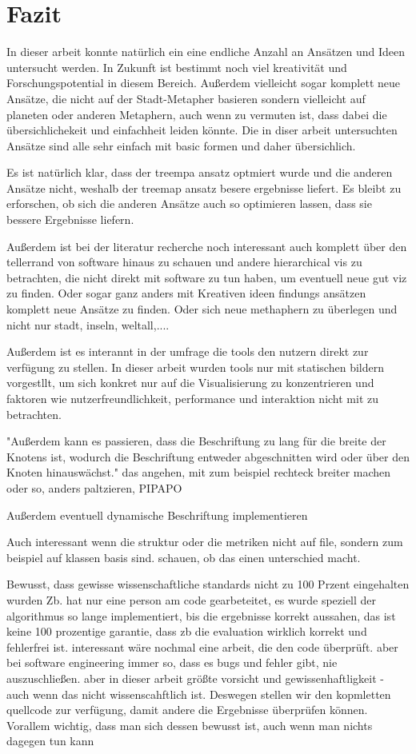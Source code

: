 \chapter{Fazit} \label{sec:Fazit}
In dieser arbeit konnte natürlich ein eine endliche Anzahl an Ansätzen und Ideen untersucht werden. In Zukunft ist bestimmt noch viel kreativität und Forschungspotential in diesem Bereich. Außerdem vielleicht sogar komplett neue Ansätze, die nicht auf der Stadt-Metapher basieren sondern vielleicht auf planeten oder anderen Metaphern, auch wenn zu vermuten ist, dass dabei die übersichlichekeit und einfachheit leiden könnte. Die in diser arbeit untersuchten Ansätze sind alle sehr einfach mit basic formen und daher übersichlich.


Es ist natürlich klar, dass der treempa ansatz optmiert wurde und die anderen Ansätze nicht, weshalb der treemap ansatz besere ergebnisse liefert. 
Es bleibt zu erforschen, ob sich die anderen Ansätze auch so optimieren lassen, dass sie bessere Ergebnisse liefern.


Außerdem ist bei der literatur recherche noch interessant auch komplett über den tellerrand von software hinaus zu schauen und andere hierarchical vis zu betrachten, die nicht direkt mit software zu tun haben, um eventuell neue gut viz zu finden. Oder sogar ganz anders mit Kreativen ideen findungs ansätzen komplett neue Ansätze zu finden. Oder sich neue methaphern zu überlegen und nicht nur stadt, inseln, weltall,....

Außerdem ist es interannt in der umfrage die tools den nutzern direkt zur verfügung zu stellen. In dieser arbeit wurden tools nur mit statischen bildern vorgestllt, um sich konkret nur auf die Visualisierung zu konzentrieren und faktoren wie nutzerfreundlichkeit, performance und interaktion nicht mit zu betrachten.

"Außerdem kann es passieren, dass die Beschriftung zu lang für die breite der Knotens ist, wodurch die Beschriftung entweder abgeschnitten wird oder über den Knoten hinauswächst." das angehen, mit zum beispiel rechteck breiter machen oder so, anders paltzieren, PIPAPO

Außerdem eventuell dynamische Beschriftung implementieren


Auch interessant wenn die struktur oder die metriken nicht auf file, sondern zum beispiel auf klassen basis sind. schauen, ob das einen unterschied macht.


Bewusst, dass gewisse wissenschaftliche standards nicht zu 100 Przent eingehalten wurden
Zb. hat nur eine person am code gearbeteitet, es wurde speziell der algorithmus so lange implementiert, bis die ergebnisse korrekt aussahen, das ist keine 100 prozentige garantie, dass zb die evaluation wirklich korrekt und fehlerfrei ist. interessant wäre nochmal eine arbeit, die den code überprüft. aber bei software engineering immer so, dass es bugs und fehler gibt, nie auszuschließen. aber in dieser arbeit größte vorsicht und gewissenhaftligkeit - auch wenn das nicht wissenscahftlich ist. Deswegen stellen wir den kopmletten quellcode zur verfügung, damit andere die Ergebnisse überprüfen können.
Vorallem wichtig, dass man sich dessen bewusst ist, auch wenn man nichts dagegen tun kann